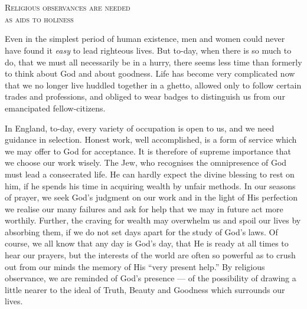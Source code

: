 \chapter{}

{
  \centering\larger
  \textsc{Religious observances are needed\\ as aids
    to holiness}

}

\vspace*{2\baselineskip}

Even in the simplest period of human existence,
men and women could never have
found it \textsl{easy} to lead righteous lives.
But to-day, when there is so much to do,
that we must all necessarily be in a hurry,
there seems less time than formerly to
think about God and about goodness. Life
has become very complicated now that we
no longer live huddled together in a ghetto,
allowed only to follow certain trades and
professions, and obliged to wear badges
to distinguish us from our emancipated
fellow-citizens.

In England, to-day, every variety of occupation
is open to us, and we need
guidance in selection. Honest work, well
accomplished, is a form of service which
we may offer to God for acceptance. It
is therefore of supreme importance that we
choose our work wisely. The Jew, who
recognises the omnipresence of God must
lead a consecrated life. He can hardly
expect the divine blessing to rest on him,
if he spends his time in acquiring wealth
by unfair methods. In our seasons of
prayer, we seek God’s judgment on our
work and in the light of His perfection we
realise our many failures and ask for help
that we may in future act more worthily.
Further, the craving for wealth may overwhelm
us and spoil our lives by absorbing
them, if we do not set days apart for the
study of God’s laws. Of course, we all
know that any day is God’s day, that He
is ready at all times to hear our prayers,
but the interests of the world are often so
powerful as to crush out from our minds
the memory of His “very present help.”
By religious observance, we are reminded
of God's presence — of the possibility of
drawing a little nearer to the ideal of
Truth, Beauty and Goodness which surrounds
our lives.

